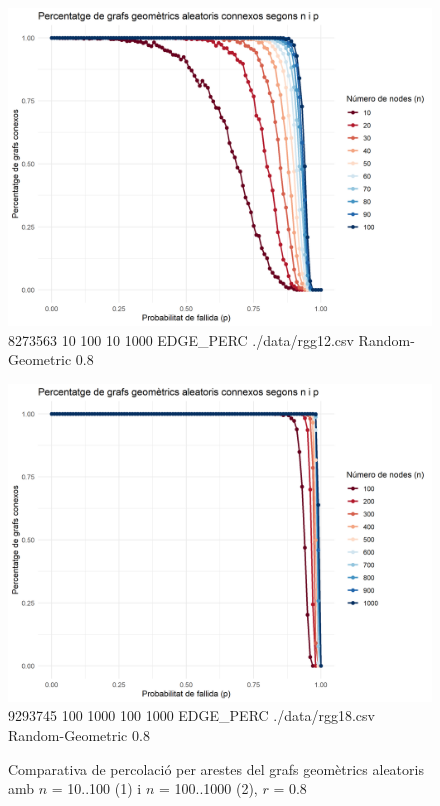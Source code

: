 \documentclass[a4paper]{article}
\begin{document}
	
	\begin{figure}[H]
		\centering
		\begin{minipage}{0.45\textwidth}
			\centering
			\includegraphics[width=\textwidth]{images/randomGeometric_10-100_0.8}
			\footnotesize{8273563 10 100 10 1000 EDGE\_PERC ./data/rgg12.csv Random-Geometric 0.8}
		\end{minipage}
		\hfill
		\begin{minipage}{0.45\textwidth}
			\centering
			\includegraphics[width=\textwidth]{images/randomGeometric_100-1000_0.8}
			\footnotesize{9293745 100 1000 100 1000 EDGE\_PERC ./data/rgg18.csv Random-Geometric 0.8}
		\end{minipage}
		\caption{Comparativa de percolació per arestes del grafs geomètrics aleatoris amb $n$ = 10..100 (1) i $n$ = 100..1000 (2), $r$ = 0.8}
		\label{fig:percolation_edges_rgg_0.8}
	\end{figure}
	
\end{document}
